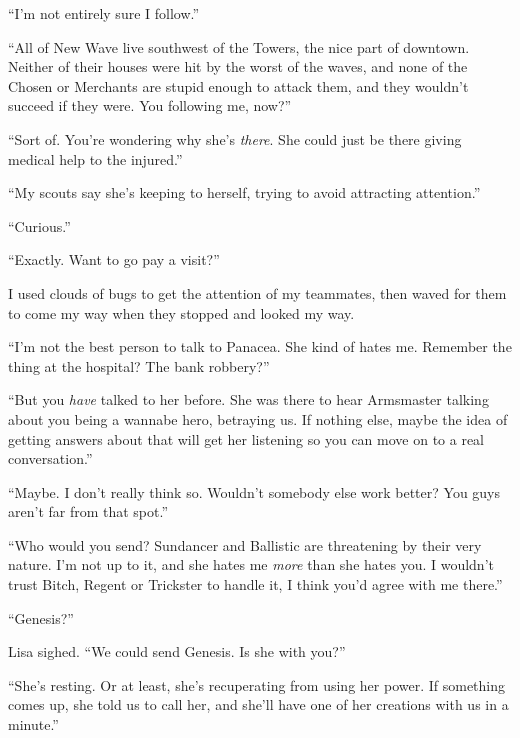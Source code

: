 ``I'm not entirely sure I follow.''



``All of New Wave live southwest of the Towers, the nice part of downtown.  Neither of their houses were hit by the worst of the waves, and none of the Chosen or Merchants are stupid enough to attack them, and they wouldn't succeed if they were.  You following me, now?''



``Sort of.  You're wondering why she's \emph{there}.  She could just be there giving medical help to the injured.''



``My scouts say she's keeping to herself, trying to avoid attracting attention.''



``Curious.''



``Exactly.  Want to go pay a visit?''



I used clouds of bugs to get the attention of my teammates, then waved for them to come my way when they stopped and looked my way.



``I'm not the best person to talk to Panacea.  She kind of hates me.  Remember the thing at the hospital?  The bank robbery?''



``But you \emph{have} talked to her before.  She was there to hear Armsmaster talking about you being a wannabe hero, betraying us.  If nothing else, maybe the idea of getting answers about that will get her listening so you can move on to a real conversation.''



``Maybe.  I don't really think so.  Wouldn't somebody else work better?  You guys aren't far from that spot.''



``Who would you send?  Sundancer and Ballistic are threatening by their very nature.  I'm not up to it, and she hates me \emph{more} than she hates you.  I wouldn't trust Bitch, Regent or Trickster to handle it, I think you'd agree with me there.''



``Genesis?''



Lisa sighed.  ``We could send Genesis.  Is she with you?''



``She's resting.  Or at least, she's recuperating from using her power.  If something comes up, she told us to call her, and she'll have one of her creations with us in a minute.''



